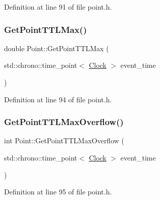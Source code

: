Definition at line 91 of file point.\+h.

\mbox{\label{class_point_a0800eea77109f6fbb1220b4d551a70d3}} 
\subsubsection{\texorpdfstring{Get\+Point\+T\+T\+L\+Max()}{GetPointTTLMax()}}
{\footnotesize\ttfamily double Point\+::\+Get\+Point\+T\+T\+L\+Max (\begin{DoxyParamCaption}\item[{std\+::chrono\+::time\+\_\+point$<$ \mbox{\hyperlink{universe_8h_a0ef8d951d1ca5ab3cfaf7ab4c7a6fd80}{Clock}} $>$}]{event\+\_\+time }\end{DoxyParamCaption})\hspace{0.3cm}{\ttfamily [inline]}}



Definition at line 94 of file point.\+h.

\mbox{\label{class_point_a61d7e0fb0fd0280f628ea46609082809}} 
\subsubsection{\texorpdfstring{Get\+Point\+T\+T\+L\+Max\+Overflow()}{GetPointTTLMaxOverflow()}}
{\footnotesize\ttfamily int Point\+::\+Get\+Point\+T\+T\+L\+Max\+Overflow (\begin{DoxyParamCaption}\item[{std\+::chrono\+::time\+\_\+point$<$ \mbox{\hyperlink{universe_8h_a0ef8d951d1ca5ab3cfaf7ab4c7a6fd80}{Clock}} $>$}]{event\+\_\+time }\end{DoxyParamCaption})\hspace{0.3cm}{\ttfamily [inline]}}



Definition at line 95 of file point.\+h.

\mbox{\label{class_point_a272b99a9cd054b09c8944b9f0e657890}} 
